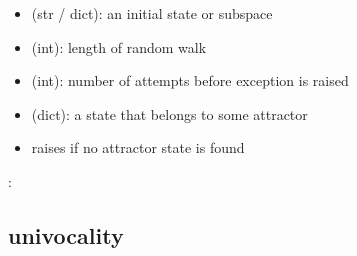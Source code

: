 \documentclass[letterpaper,10pt,english]{sphinxmanual}
\begin{document}
\begin{fulllineitems}
\begin{description}
\begin{itemize}
\item {} 
 (str / dict): an initial state or subspace

\item {} 
 (int): length of random walk

\item {} 
 (int): number of attempts before exception is raised

\end{itemize}

\item[{\sphinxstylestrong{returns}:}] \leavevmode\begin{itemize}
\item {} 
 (dict): a state that belongs to some attractor

\item {} 
raises  if no attractor state is found

\end{itemize}

\end{description}

:

\begin{sphinxVerbatim}[commandchars=\\\{\}]
 
\end{sphinxVerbatim}

\end{fulllineitems}



\subsection{univocality}
\label{\detokenize{AttractorDetection:univocality}}\label{\detokenize{AttractorDetection:id4}}
\end{document}
